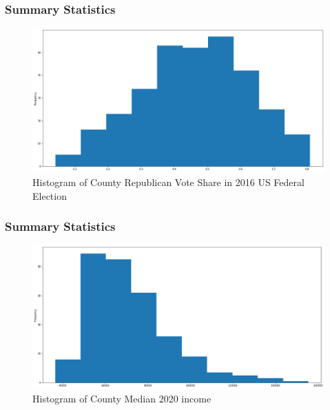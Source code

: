 \documentclass{beamer}
\begin{document}
\begin{frame}
\frametitle{Summary Statistics}

\begin{figure}[!htb]
  \includegraphics[width=\textwidth]{elechist}
  \caption{Histogram of County Republican Vote Share in 2016 US Federal Election}
\end{figure}

\end{frame}

\begin{frame}
\frametitle{Summary Statistics}

\begin{figure}[!htb]
  \includegraphics[width=\textwidth]{incomehist}
  \caption{Histogram of County Median 2020 income}
\end{figure}

\end{frame}
\end{document}
